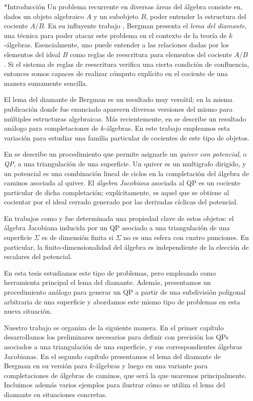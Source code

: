 \begin{chapter}*{Introducción}
Un problema recurrente en diversas áreas del álgebra consiste en, dados un objeto algebraico $A$ y un subobjeto $B$, poder entender la estructura del cociente $A/B$. En su influyente trabajo \cite{Ber78}, Bergman presenta el \emph{lema del diamante}, una técnica para poder atacar este problema en el contexto de la teoría de $k$-álgebras. Esencialmente, uno puede entender a las relaciones dadas por los elementos del ideal $B$ como reglas de reescritura para elementos del cociente $A/B$. Si el sistema de reglas de reescritura verifica una cierta condición de confluencia, entonces somos capaces de realizar cómputo explícito en el cociente de una manera sumamente sencilla.

El lema del diamante de Bergman es un resultado muy versátil; en la misma publicación donde fue enunciado aparecen diversas versiones del mismo para múltiples estructuras algebraicas. Más recientemente, en \cite{SAV15} se describe un resultado análogo para completaciones de $k$-álgebras. En este trabajo empleamos esta variación para estudiar una familia particular de cocientes de este tipo de objetos.

En \cite{DWZ08} se describe un procedimiento que permite asignarle un \emph{quiver con potencial}, o \emph{QP}, a una triangulación de una superficie. Un quiver es un multigrafo dirigido, y un potencial es una combinación lineal de ciclos en la completación del álgebra de caminos asociada al quiver. El \emph{álgebra Jacobiana} asociada al QP es un cociente particular de dicha completación; explícitamente, es aquel que se obtiene al cocientar por el ideal cerrado generado por las derivadas cíclicas del potencial.

En trabajos como \cite{Lad12} y \cite{TVD12} fue determinada una propiedad clave de estos objetos: el álgebra Jacobiana inducida por un QP asociado a una triangulación de una superficie $\Sigma$ es de dimensión finita si $\Sigma$ no es una esfera con cuatro punciones. En particular, la finito-dimensionalidad del álgebra es independiente de la elección de escalares del potencial.

En esta tesis estudiamos este tipo de problemas, pero empleando como herramienta principal el lema del diamante. Además, presentamos un procedimiento análogo para generar un QP a partir de una subdivisión poligonal arbitraria de una superficie y abordamos este mismo tipo de problemas en esta nueva situación.

Nuestro trabajo se organiza de la siguiente manera. En el primer capítulo desarrollamos los preliminares necesarios para definir con precisión los QPs asociados a una triangulación de una superficie, y sus correspondientes álgebras Jacobianas. En el segundo capítulo presentamos el lema del diamante de Bergman en su versión para $k$-álgebras y luego en una variante para completaciones de álgebras de caminos, que será la que usaremos principalmente. Incluimos además varios ejemplos para ilustrar cómo se utiliza el lema del diamante en situaciones concretas.


\end{chapter}
